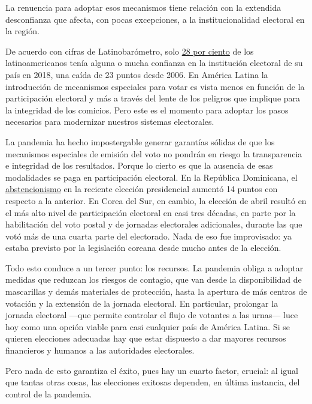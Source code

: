 La renuencia para adoptar esos mecanismos tiene relación con la
extendida desconfianza que afecta, con pocas excepciones, a la
institucionalidad electoral en la región.

De acuerdo con cifras de Latinobarómetro, solo
\href{https://www.latinobarometro.org/latContents.jsp}{28 por ciento} de
los latinoamericanos tenía alguna o mucha confianza en la institución
electoral de su país en 2018, una caída de 23 puntos desde 2006. En
América Latina la introducción de mecanismos especiales para votar es
vista menos en función de la participación electoral y más a través del
lente de los peligros que implique para la integridad de los comicios.
Pero este es el momento para adoptar los pasos necesarios para
modernizar nuestros sistemas electorales.

La pandemia ha hecho impostergable generar garantías sólidas de que los
mecanismos especiales de emisión del voto no pondrán en riesgo la
transparencia e integridad de los resultados. Porque lo cierto es que la
ausencia de esas modalidades se paga en participación electoral. En la
República Dominicana, el
\href{https://www.elpais.cr/2020/07/08/alta-abstencion-en-comicios-de-la-republica-dominicana/}{abstencionismo}
en la reciente elección presidencial aumentó 14 puntos con respecto a la
anterior. En Corea del Sur, en cambio, la elección de abril resultó en
el más alto nivel de participación electoral en casi tres décadas, en
parte por la habilitación del voto postal y de jornadas electorales
adicionales, durante las que votó más de una cuarta parte del
electorado. Nada de eso fue improvisado: ya estaba previsto por la
legislación coreana desde mucho antes de la elección.

Todo esto conduce a un tercer punto: los recursos. La pandemia obliga a
adoptar medidas que reduzcan los riesgos de contagio, que van desde la
disponibilidad de mascarillas y demás materiales de protección, hasta la
apertura de más centros de votación y la extensión de la jornada
electoral. En particular, prolongar la jornada electoral ---que permite
controlar el flujo de votantes a las urnas--- luce hoy como una opción
viable para casi cualquier país de América Latina. Si se quieren
elecciones adecuadas hay que estar dispuesto a dar mayores recursos
financieros y humanos a las autoridades electorales.

Pero nada de esto garantiza el éxito, pues hay un cuarto factor,
crucial: al igual que tantas otras cosas, las elecciones exitosas
dependen, en última instancia, del control de la pandemia.

